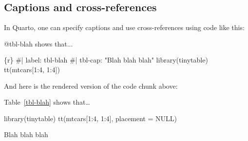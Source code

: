 \documentclass[
  letterpaper,
  DIV=11,
  numbers=noendperiod]{scrartcl}
\newenvironment{Shaded}{\begin{snugshade}}{\end{snugshade}}
\newcommand{\AttributeTok}[1]{\textcolor[rgb]{0.40,0.45,0.13}{#1}}
\newcommand{\ConstantTok}[1]{\textcolor[rgb]{0.56,0.35,0.01}{#1}}
\newcommand{\DecValTok}[1]{\textcolor[rgb]{0.68,0.00,0.00}{#1}}
\newcommand{\FunctionTok}[1]{\textcolor[rgb]{0.28,0.35,0.67}{#1}}
\newcommand{\NormalTok}[1]{\textcolor[rgb]{0.00,0.23,0.31}{#1}}
\newcommand{\SpecialCharTok}[1]{\textcolor[rgb]{0.37,0.37,0.37}{#1}}
\begin{document}
\subsection{Captions and
cross-references}\label{captions-and-cross-references}

In Quarto, one can specify captions and use cross-references using code
like this:

\begin{Shaded}
\begin{Highlighting}[]
\NormalTok{@tbl{-}blah shows that...}

\NormalTok{\textasciigrave{}\textasciigrave{}\textasciigrave{}\{r\}}
\NormalTok{\#| label: tbl{-}blah}
\NormalTok{\#| tbl{-}cap: "Blah blah blah"}
\NormalTok{library(tinytable)}
\NormalTok{tt(mtcars[1:4, 1:4])}
\NormalTok{\textasciigrave{}\textasciigrave{}\textasciigrave{}}
\end{Highlighting}
\end{Shaded}

And here is the rendered version of the code chunk above:

Table~\ref{tbl-blah} shows that\ldots{}

\begin{Shaded}
\begin{Highlighting}[]
\FunctionTok{library}\NormalTok{(tinytable)}
\FunctionTok{tt}\NormalTok{(mtcars[}\DecValTok{1}\SpecialCharTok{:}\DecValTok{4}\NormalTok{, }\DecValTok{1}\SpecialCharTok{:}\DecValTok{4}\NormalTok{], }\AttributeTok{placement =} \ConstantTok{NULL}\NormalTok{)}
\end{Highlighting}
\end{Shaded}

\begin{table}

\caption{\label{tbl-blah}Blah blah blah}


\end{table}%
\end{document}
